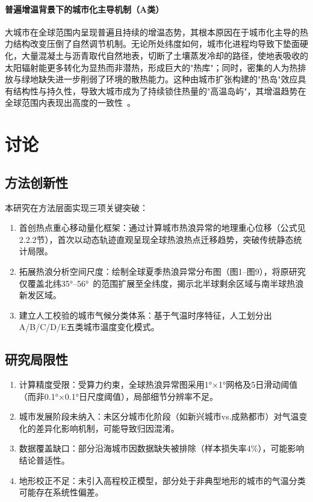 \documentclass[a4paper,UTF8,scheme=chinese,zihao=-4,twoside]{ctexart}
\makeatletter
\newcommand{\初号}{\zihao{0}}
\newcommand{\小初}{\zihao{-0}}
\newcommand{\一号}{\zihao{1}}
\newcommand{\小一}{\zihao{-1}}
\newcommand{\二号}{\zihao{2}}
\newcommand{\小二}{\zihao{-2}}
\newcommand{\三号}{\zihao{3}}
\newcommand{\小三}{\zihao{-3}}
\newcommand{\四号}{\zihao{4}}
\newcommand{\小四}{\zihao{-4}}
\newcommand{\五号}{\zihao{5}}
\newcommand{\小五}{\zihao{-5}}
\newcommand{\六号}{\zihao{6}}
\newcommand{\小六}{\zihao{-6}}
\newcommand{\七号}{\zihao{7}}
\newcommand{\八号}{\zihao{8}}
\newcommand{\宋体}{\songti}
\newcommand{\黑体}{\heiti}
\newcommand{\仿宋}{\fangsong}
\newcommand{\楷书}{\kaishu}
\newcommand{\粗体}{\bfseries}
\newcommand{\斜体}{\itshape}
\newcommand\下划线[2][6em]{\hskip1pt\underline{\hb@xt@ #1{\hss#2\hss}}\hskip3pt}
\makeatother
\begin{document}
\paragraph{普遍增温背景下的城市化主导机制（A类）}

大城市在全球范围内呈现普遍且持续的增温态势，其根本原因在于城市化主导的热力结构改变压倒了自然调节机制。无论所处纬度如何，城市化进程均导致下垫面硬化，大量混凝土与沥青取代自然地表，切断了土壤蒸发冷却的路径，使地表吸收的太阳辐射能更多转化为显热而非潜热，形成巨大的"热库"；同时，密集的人为热排放与绿地缺失进一步削弱了环境的散热能力。这种由城市扩张构建的"热岛"效应具有结构性与持久性，导致大城市成为了持续锁住热量的"高温岛屿"，其增温趋势在全球范围内表现出高度的一致性~\cite{stewart2012,demuzere2022}。

\section{讨论}

\subsection{方法创新性}

本研究在方法层面实现三项关键突破：

\begin{enumerate}[label=\arabic*、]
    \item 首创热点重心移动量化框架：通过计算城市热浪异常的地理重心位移（公式见2.2.2节），首次以动态轨迹直观呈现全球热浪热点迁移趋势，突破传统静态统计局限。
    \item 拓展热浪分析空间尺度：绘制全球夏季热浪异常分布图（图1–图9），将原研究仅覆盖北纬35°–56°~\cite{zhang2025}的范围扩展至全纬度，揭示北半球剩余区域与南半球热浪新发区域。
    \item 建立人工校验的城市气候分类体系：基于气温时序特征，人工划分出A/B/C/D/E五类城市温度变化模式。
\end{enumerate}

\subsection{研究局限性}

\begin{enumerate}
    \item 计算精度受限：受算力约束，全球热浪异常图采用1°×1°网格及5日滑动阈值（而非0.1°×0.1°日尺度阈值），局部细节分辨率不足。
    \item 城市发展阶段未纳入：未区分城市化阶段（如新兴城市vs.成熟都市）对气温变化的差异化影响机制，可能导致归因混淆。
    \item 数据覆盖缺口：部分沿海城市因数据缺失被排除（样本损失率4\%），可能影响结论普适性。
    \item 地形校正不足：未引入高程校正模型，部分处于非典型地形的城市的气温分类可能存在系统性偏差。
\end{enumerate}
\end{document}

